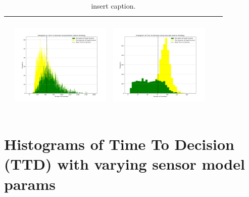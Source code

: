 \begin{landscape}
\begin{table}[h!]
\begin{tabular}{ | c | c | c | c | c |}
\begin{minipage}[c][48mm][c]{48mm}
    \end{minipage}
    &
    \begin{minipage}[c][48mm][c]{48mm}
      \includegraphics[width=48mm, height=48mm]{Chapters/MultiAgentTargetDetection/Figs/Histograms/VaryingInitBelief/25/25RandomHistogram.png}
    \end{minipage}
    &
    \begin{minipage}[c][48mm][c]{48mm}
      \includegraphics[width=48mm, height=48mm]{Chapters/MultiAgentTargetDetection/Figs/Histograms/VaryingInitBelief/25/25SaccadicHistogram.png}
    \end{minipage}
    \\
    \hline
   
  \end{tabular}
  \caption{insert caption. }\label{table:ORToolsResults}
\end{table}
\break




\vspace*{\fill}
\section{Histograms of Time To Decision (TTD) with varying sensor model params}


\end{landscape}
